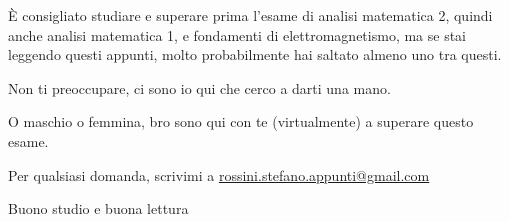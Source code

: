 È consigliato studiare e superare prima l’esame di analisi matematica 2, quindi anche analisi matematica 1,  e fondamenti di elettromagnetismo, ma se stai leggendo questi appunti, molto probabilmente hai saltato almeno uno tra questi. \newline 

Non ti preoccupare, ci sono io qui che cerco a darti una mano. \newline 

O maschio o femmina, bro sono qui con te (virtualmente) a superare questo esame. \newline 

Per qualsiasi domanda, scrivimi a \href{mailto:rossini.stefano.appunti@gmail.com}{rossini.stefano.appunti@gmail.com} \newline

Buono studio e buona lettura \newline

\newpage 





